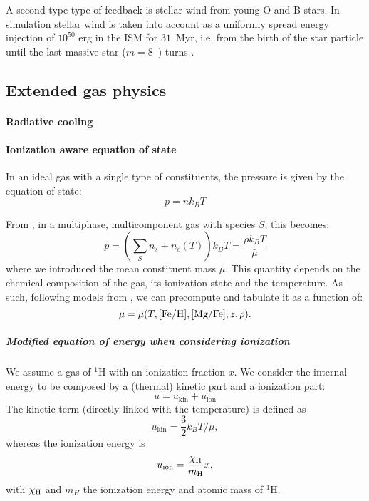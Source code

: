 A second type type of feedback is stellar wind from young O and B stars.
In simulation stellar wind is taken into account as a uniformly spread energy injection of $10^{50}$ erg in the ISM for $31$~Myr, i.e. from the birth of the star particle until the last massive star ($m = 8$~\Msun) turns \snii{}.



\subsection{Extended gas physics}
\paragraph{Radiative cooling}

\paragraph{Ionization aware equation of state}
In an ideal gas with a single type of constituents, the pressure is given by the equation of state:
\begin{equation}
p = n k_B T
\end{equation}

From \citep[p. 161]{Vandenbroucke2016}, in a multiphase, multicomponent gas with species $S$, this becomes:
\begin{equation}
p = \left(\sum_S n_s + n_e(T)\right) k_BT =\frac{\rho k_B T}{\bar\mu}
\end{equation}
where we introduced the mean constituent mass $\bar\mu$.
This quantity depends on the chemical composition of the gas, its ionization state and the temperature.
As such, following models from \citet{DeRijcke2013}, we can precompute and tabulate it as a function of:
\[\bar\mu = \bar\mu(T, [\text{Fe}/\text{H}], [\text{Mg}/\text{Fe}], z, \rho).\]

\subparagraph{Modified equation of energy when considering ionization}
We assume a gas of ${}^1$H with an ionization fraction $x$.
We consider the internal energy to be composed by a (thermal) kinetic part and a ionization part:
\begin{equation}
\label{eq:u}
u = u_\text{kin} + u_\text{ion}
\end{equation}
The kinetic term (directly linked with the temperature) is defined as
\begin{equation}
u_\text{kin} = \frac 3 2 k_B T/ \mu, 
\end{equation}
whereas the ionization energy is
\begin{equation}
\label{eq:u_ion}
u_\text{ion} = \dfrac{\chi_\text H}{m_\text H} x,
\end{equation}
with $\chi_\text H$ and $m_H$ the ionization energy and atomic mass of ${}^1$H.

